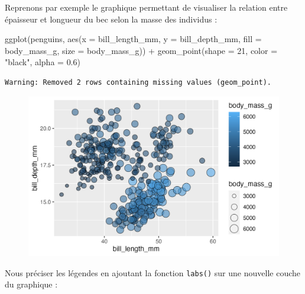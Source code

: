 \documentclass[
  letterpaper,
  DIV=11,
  numbers=noendperiod]{scrreprt}
\newenvironment{Shaded}{\begin{snugshade}}{\end{snugshade}}
\newcommand{\AttributeTok}[1]{\textcolor[rgb]{0.40,0.45,0.13}{#1}}
\newcommand{\DecValTok}[1]{\textcolor[rgb]{0.68,0.00,0.00}{#1}}
\newcommand{\FloatTok}[1]{\textcolor[rgb]{0.68,0.00,0.00}{#1}}
\newcommand{\FunctionTok}[1]{\textcolor[rgb]{0.28,0.35,0.67}{#1}}
\newcommand{\NormalTok}[1]{\textcolor[rgb]{0.00,0.23,0.31}{#1}}
\newcommand{\SpecialCharTok}[1]{\textcolor[rgb]{0.37,0.37,0.37}{#1}}
\newcommand{\StringTok}[1]{\textcolor[rgb]{0.13,0.47,0.30}{#1}}
\begin{document}
Reprenons par exemple le graphique permettant de visualiser la relation
entre épaisseur et longueur du bec selon la masse des individus :

\begin{Shaded}
\begin{Highlighting}[]
\FunctionTok{ggplot}\NormalTok{(penguins, }\FunctionTok{aes}\NormalTok{(}\AttributeTok{x =}\NormalTok{ bill\_length\_mm, }\AttributeTok{y =}\NormalTok{ bill\_depth\_mm,}
                     \AttributeTok{fill =}\NormalTok{ body\_mass\_g, }\AttributeTok{size =}\NormalTok{ body\_mass\_g)) }\SpecialCharTok{+}
  \FunctionTok{geom\_point}\NormalTok{(}\AttributeTok{shape =} \DecValTok{21}\NormalTok{, }\AttributeTok{color =} \StringTok{"black"}\NormalTok{, }\AttributeTok{alpha =} \FloatTok{0.6}\NormalTok{)}
\end{Highlighting}
\end{Shaded}

\begin{verbatim}
Warning: Removed 2 rows containing missing values (geom_point).
\end{verbatim}

\begin{figure}[H]

{\centering \includegraphics{./03-visualization_files/figure-pdf/unnamed-chunk-87-1.png}

}

\end{figure}

Nous préciser les légendes en ajoutant la fonction \texttt{labs()} sur
une nouvelle couche du graphique :
\end{document}
